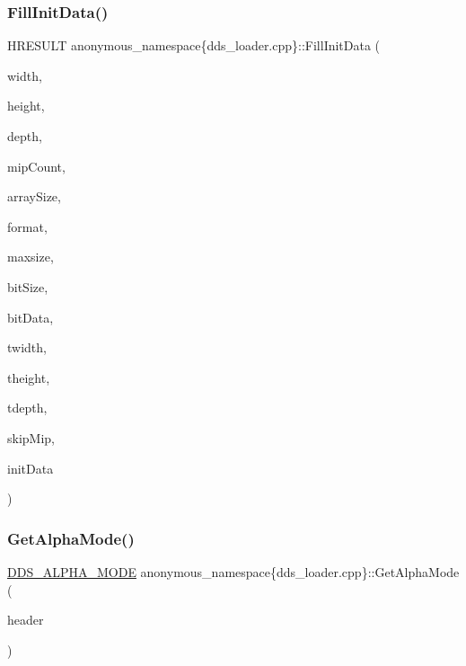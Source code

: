 \subsubsection{\texorpdfstring{Fill\+Init\+Data()}{FillInitData()}}
{\footnotesize\ttfamily H\+R\+E\+S\+U\+LT anonymous\+\_\+namespace\{dds\+\_\+loader.\+cpp\}\+::Fill\+Init\+Data (\begin{DoxyParamCaption}\item[{\+\_\+\+In\+\_\+ size\+\_\+t}]{width,  }\item[{\+\_\+\+In\+\_\+ size\+\_\+t}]{height,  }\item[{\+\_\+\+In\+\_\+ size\+\_\+t}]{depth,  }\item[{\+\_\+\+In\+\_\+ size\+\_\+t}]{mip\+Count,  }\item[{\+\_\+\+In\+\_\+ size\+\_\+t}]{array\+Size,  }\item[{\+\_\+\+In\+\_\+ D\+X\+G\+I\+\_\+\+F\+O\+R\+M\+AT}]{format,  }\item[{\+\_\+\+In\+\_\+ size\+\_\+t}]{maxsize,  }\item[{\+\_\+\+In\+\_\+ size\+\_\+t}]{bit\+Size,  }\item[{\+\_\+\+In\+\_\+reads\+\_\+bytes\+\_\+(bit\+Size) const uint8\+\_\+t $\ast$}]{bit\+Data,  }\item[{\+\_\+\+Out\+\_\+ size\+\_\+t \&}]{twidth,  }\item[{\+\_\+\+Out\+\_\+ size\+\_\+t \&}]{theight,  }\item[{\+\_\+\+Out\+\_\+ size\+\_\+t \&}]{tdepth,  }\item[{\+\_\+\+Out\+\_\+ size\+\_\+t \&}]{skip\+Mip,  }\item[{\+\_\+\+Out\+\_\+writes\+\_\+(mip\+Count $\ast$array\+Size) D3\+D11\+\_\+\+S\+U\+B\+R\+E\+S\+O\+U\+R\+C\+E\+\_\+\+D\+A\+TA $\ast$}]{init\+Data }\end{DoxyParamCaption})}

\mbox{\label{namespaceanonymous__namespace_02dds__loader_8cpp_03_acd06d26c6b5121b02a055280b53fbf46}} 
\subsubsection{\texorpdfstring{Get\+Alpha\+Mode()}{GetAlphaMode()}}
{\footnotesize\ttfamily \mbox{\hyperlink{namespace_direct_x_a7cb48689d75471680c0bf7f79caaaf1f}{D\+D\+S\+\_\+\+A\+L\+P\+H\+A\+\_\+\+M\+O\+DE}} anonymous\+\_\+namespace\{dds\+\_\+loader.\+cpp\}\+::Get\+Alpha\+Mode (\begin{DoxyParamCaption}\item[{\+\_\+\+In\+\_\+ const \mbox{\hyperlink{struct_d_d_s___h_e_a_d_e_r}{D\+D\+S\+\_\+\+H\+E\+A\+D\+ER}} $\ast$}]{header }\end{DoxyParamCaption})}

